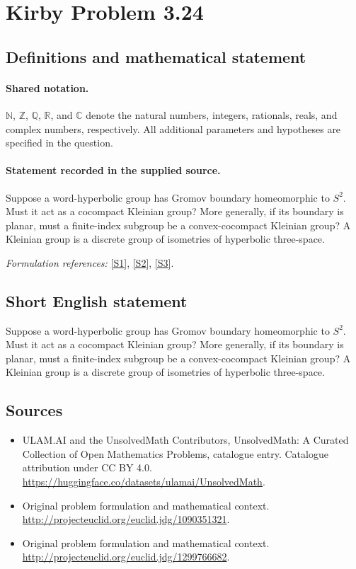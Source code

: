 \documentclass[11pt]{article}
\newcommand{\sref}[2]{\hyperlink{source:#1:#2}{[S#2]}}
\begin{document}
\section{Kirby Problem 3.24}\label{statement}

\subsection{Definitions and mathematical statement}

\paragraph{Shared notation.}$\mathbb N$, $\mathbb Z$, $\mathbb Q$, $\mathbb R$, and $\mathbb C$ denote the natural numbers, integers, rationals, reals, and complex numbers, respectively. All additional parameters and hypotheses are specified in the question.


\paragraph{Statement recorded in the supplied source.}
Suppose a word-hyperbolic group has Gromov boundary homeomorphic to $S^2$. Must it act as a cocompact Kleinian group? More generally, if its boundary is planar, must a finite-index subgroup be a convex-cocompact Kleinian group? A Kleinian group is a discrete group of isometries of hyperbolic three-space.
\par\smallskip\textit{Formulation references:} \sref{statement}{1}, \sref{statement}{2}, \sref{statement}{3}.
\subsection{Short English statement}
Suppose a word-hyperbolic group has Gromov boundary homeomorphic to $S^2$. Must it act as a cocompact Kleinian group? More generally, if its boundary is planar, must a finite-index subgroup be a convex-cocompact Kleinian group? A Kleinian group is a discrete group of isometries of hyperbolic three-space.
\subsection{Sources}
\begin{itemize}
\item[\hypertarget{source:statement:1}{S1}] ULAM.AI and the UnsolvedMath Contributors, UnsolvedMath: A Curated Collection of Open Mathematics Problems, catalogue entry. Catalogue attribution under CC BY 4.0.
\url{https://huggingface.co/datasets/ulamai/UnsolvedMath}.
\item[\hypertarget{source:statement:2}{S2}] Original problem formulation and mathematical context.
\url{http://projecteuclid.org/euclid.jdg/1090351321}.
\item[\hypertarget{source:statement:3}{S3}] Original problem formulation and mathematical context.
\url{http://projecteuclid.org/euclid.jdg/1299766682}.
\end{itemize}
\label{end:statement}
\end{document}
